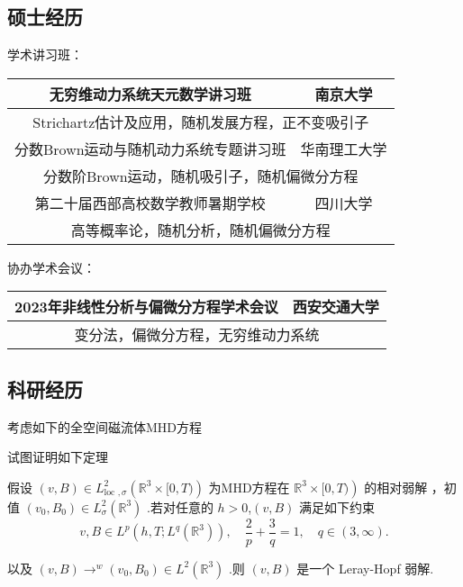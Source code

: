 \documentclass{beamer}
\begin{document}
\subsection{硕士经历}

\begin{frame}

学术讲习班：
\begin{tabular}{|c|c|}
\hline 无穷维动力系统天元数学讲习班 & 南京大学\\
\hline \multicolumn{2}{|c|}{Strichartz估计及应用，随机发展方程，正不变吸引子} \\
\hline 分数Brown运动与随机动力系统专题讲习班 & 华南理工大学  \\
\hline \multicolumn{2}{|c|}{分数阶Brown运动，随机吸引子，随机偏微分方程} \\
\hline 第二十届西部高校数学教师暑期学校 & 四川大学\\
\hline \multicolumn{2}{|c|}{高等概率论，随机分析，随机偏微分方程} \\
\hline
\end{tabular}

协办学术会议：
\begin{tabular}{|c|c|} 
\hline 2023年非线性分析与偏微分方程学术会议 & 西安交通大学 \\
\hline \multicolumn{2}{|c|}{变分法，偏微分方程，无穷维动力系统 }\\
\hline
\end{tabular}

\end{frame}


\subsection{科研经历}

\begin{frame}
考虑如下的全空间磁流体MHD方程


试图证明如下定理



\begin{theorem}
    假设 $(v, B) \in L_{\text {loc }, \sigma}^{2}\left(\mathbb{R}^{3} \times[0, T)\right) $ 为MHD方程在  $\left.\mathbb{R}^{3} \times[0, T)\right) $ 
的相对弱解 ，初值  $\left(v_{0}, B_{0}\right) \in L_{\sigma}^{2}\left(\mathbb{R}^{3}\right)$ .若对任意的  $h>0$,$(v, B) $ 满足如下约束
\begin{equation*}
v, B \in L^{p}(h, T ; L^{q}(\mathbb{R}^{3})), \quad \frac{2}{p}+\frac{3}{q}=1, \quad q \in(3, \infty).
\end{equation*}


以及 $ (v, B) \longrightarrow^w\left(v_{0}, B_{0}\right) \in  L^{2}\left(\mathbb{R}^{3}\right)$ .则 $(v, B)$  是一个 Leray-Hopf 弱解. 

\end{theorem}
\end{frame}




 
\end{document}
